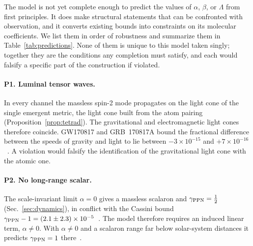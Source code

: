 \documentclass[reprint,aps,prd,amsmath,amssymb,superscriptaddress,nofootinbib,floatfix]{revtex4-2}
\theoremstyle{plain}
\theoremstyle{definition}
\theoremstyle{remark}
\begin{document}
The model is not yet complete enough to predict the values of $\alpha$, $\beta$, or $\Lambda$ from first principles.
It does make structural statements that can be confronted with observation, and it converts existing bounds
into constraints on its molecular coefficients. We list them in order of robustness and summarize them in
Table~\ref{tab:predictions}. None of them is unique to this model taken singly; together they are the
conditions any completion must satisfy, and each would falsify a specific part of the construction if
violated.

\paragraph*{P1. Luminal tensor waves.} In every channel the massless spin-2 mode propagates on the light cone of
the single emergent metric, the light cone built from the atom pairing (Proposition~\ref{prop:tetrad}). The
gravitational and electromagnetic light cones therefore coincide. GW170817 and GRB~170817A bound the
fractional difference between the speeds of gravity and light to lie between $-3\times10^{-15}$ and
$+7\times10^{-16}$~\cite{GW170817GRB}. A violation would falsify the identification of the gravitational light cone
with the atomic one.

\paragraph*{P2. No long-range scalar.} The scale-invariant limit $\alpha=0$ gives a massless scalaron and
$\gamma_{\rm PPN}=\tfrac12$ (Sec.~\ref{sec:dynamics}), in conflict with the Cassini bound
$\gamma_{\rm PPN}-1=(2.1\pm2.3)\times10^{-5}$~\cite{Bertotti2003}. The model therefore requires an induced linear term,
$\alpha\neq0$. With $\alpha\neq0$ and a scalaron range far below solar-system distances it predicts
$\gamma_{\rm PPN}=1$ there~\cite{Berry2011}.
\end{document}
